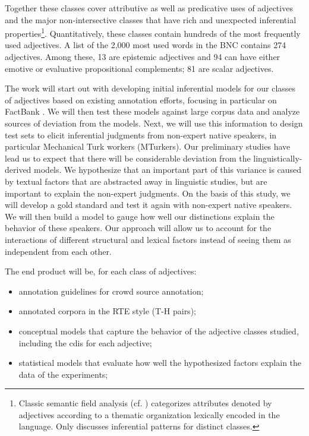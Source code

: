 \documentclass[10pt]{article}
\newcommand{\moveup}{\vspace*{-1.8mm}}
\begin{document}
Together these classes cover attributive as well as predicative uses of adjectives and the major non-intersective classes that have rich and unexpected inferential properties\footnote{Classic semantic field analysis (cf. \cite{dixon:91,lyons:77,raskin1995lexical}) categorizes attributes denoted by adjectives according to a thematic organization lexically encoded in the language. Only \cite{raskin1995lexical} discusses inferential patterns for distinct classes.}. Quantitatively, these classes contain hundreds of the most frequently used adjectives. A list of the 2,000 most used words in the BNC contains 274 adjectives. Among these, 13 are epistemic adjectives and 94 can have either emotive or evaluative propositional complements; 81 are scalar adjectives. 
 
The work will start out with developing initial inferential models for our classes of adjectives based on existing annotation efforts, focusing in particular on FactBank \cite{factbank:2009}.
We will then test these models against large corpus data and analyze sources of deviation from the models. Next, we will use this information to design test sets to elicit inferential judgments from non-expert native speakers, in particular Mechanical Turk workers (MTurkers). Our preliminary studies have lead us to expect that there will be considerable deviation from the linguistically-derived models. We hypothesize that an important part of this variance is caused by textual factors that are abstracted away in linguistic studies, but are important to explain the non-expert judgments. On the basis of this study, we will develop a gold standard and test it again with non-expert native speakers. We will then build a model to gauge how well our distinctions explain the behavior of these speakers. Our approach will allow us to account for the interactions of different structural and lexical factors instead of seeing them as independent from each other. 

The end product will be, for each class of adjectives:
\begin{itemize}
\moveup
\item annotation guidelines for crowd source annotation;
\moveup
\item annotated corpora in the RTE style (T-H pairs);
\moveup
\item conceptual models that capture the behavior of the adjective classes studied, including the {\sc cdi}s for each adjective;
\moveup
\item statistical models that evaluate how well the hypothesized factors explain the data of the experiments;
\moveup
\moveup

\moveup
\end{itemize} 
\end{document}
